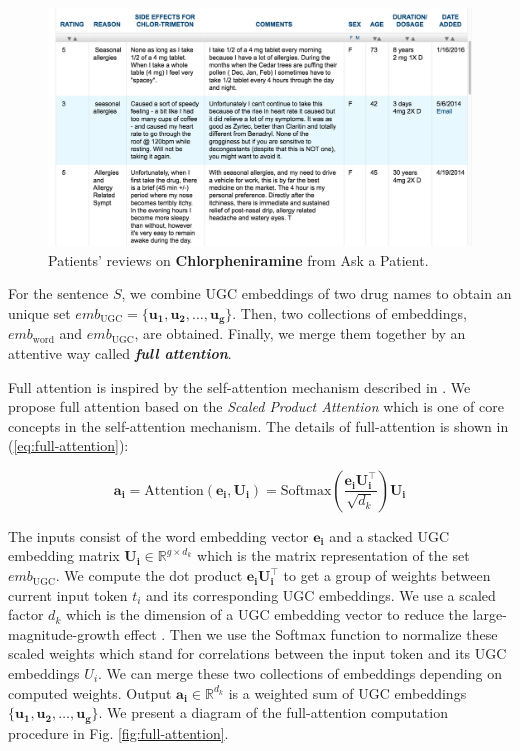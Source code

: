 \documentclass[conference]{IEEEtran}
\begin{document}
\begin{figure}[ht]
	\centering
	\includegraphics[scale=0.3]{figures/askapatient}
	\caption{Patients' reviews on \textbf{Chlorpheniramine} from Ask a Patient.}
	\label{fig:askapatient}
\end{figure}

For the sentence $S$, we combine UGC embeddings of two drug names to obtain an unique set $emb_{\text{UGC}} = \{ \bm{u_1}, \bm{u_2}, \dots, \bm{u_g}\}$.
Then, two collections of embeddings, $emb_{\text{word}}$ and $emb_{\text{UGC}}$, are obtained.
Finally, we merge them together by an attentive way called \textbf{\emph{full attention}}.

Full attention is inspired by the self-attention mechanism described in \cite{vaswani_attention_2017}.
We propose full attention based on the \emph{Scaled Product Attention} which is one of core concepts in the self-attention mechanism.
The details of full-attention is shown in (\ref{eq:full-attention}):

\begin{equation}
\label{eq:full-attention}
\bm{a_i} = \text{Attention}(\bm{e_i}, \bm{U_i}) = \text{Softmax}\left ( \frac{\bm{e_i} \bm{U_i^{\top}}}{\sqrt{d_k}} \right ) \bm{U_i}
\end{equation}

\noindent The inputs consist of the word embedding vector $\bm{e_i}$ and a stacked UGC embedding matrix $\bm{U_i} \in \mathbb{R}^{g \times d_k}$ which is the matrix representation of the set $emb_{\text{UGC}}$.
We compute the dot product $\bm{e_i} \bm{U_i^{\top}}$ to get a group of weights between current input token
$t_i$ and its corresponding UGC embeddings.
We use a scaled factor $d_k$ which is the dimension of a UGC embedding vector to reduce the
large-magnitude-growth effect \cite{vaswani_attention_2017}.
Then we use the Softmax function to normalize these scaled weights which stand for correlations between the input token and its UGC embeddings $U_i$.
We can merge these two collections of embeddings depending on computed weights.
Output $\bm{a_i} \in \mathbb{R}^{d_k}$ is a weighted sum of UGC embeddings $\{\bm{u_1}, \bm{u_2}, \dots, \bm{u_g}\}$.
We present a diagram of the full-attention computation procedure in Fig. \ref{fig:full-attention}.
\end{document}
